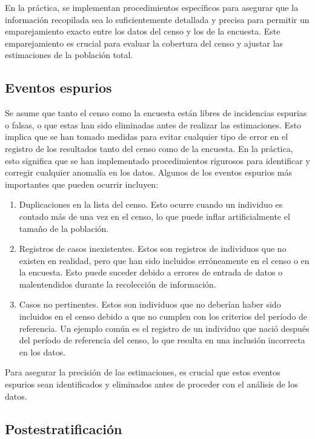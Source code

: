 \documentclass[
  12pt,
]{book}
\providecommand{\tightlist}{%
  \setlength{\itemsep}{0pt}\setlength{\parskip}{0pt}}
\begin{document}
En la práctica, se implementan procedimientos específicos para asegurar que la información recopilada sea lo suficientemente detallada y precisa para permitir un emparejamiento exacto entre los datos del censo y los de la encuesta. Este emparejamiento es crucial para evaluar la cobertura del censo y ajustar las estimaciones de la población total.

\hypertarget{eventos-espurios}{%
\subsection{Eventos espurios}\label{eventos-espurios}}

Se asume que tanto el censo como la encuesta están libres de incidencias espurias o falsas, o que estas han sido eliminadas antes de realizar las estimaciones. Esto implica que se han tomado medidas para evitar cualquier tipo de error en el registro de los resultados tanto del censo como de la encuesta. En la práctica, esto significa que se han implementado procedimientos rigurosos para identificar y corregir cualquier anomalía en los datos. Algunos de los eventos espurios más importantes que pueden ocurrir incluyen:

\begin{enumerate}
\def\labelenumi{\arabic{enumi}.}
\tightlist
\item
  Duplicaciones en la lista del censo. Esto ocurre cuando un individuo es contado más de una vez en el censo, lo que puede inflar artificialmente el tamaño de la población.
\item
  Registros de casos inexistentes. Estos son registros de individuos que no existen en realidad, pero que han sido incluidos erróneamente en el censo o en la encuesta. Esto puede suceder debido a errores de entrada de datos o malentendidos durante la recolección de información.
\item
  Casos no pertinentes. Estos son individuos que no deberían haber sido incluidos en el censo debido a que no cumplen con los criterios del período de referencia. Un ejemplo común es el registro de un individuo que nació después del período de referencia del censo, lo que resulta en una inclusión incorrecta en los datos.
\end{enumerate}

Para asegurar la precisión de las estimaciones, es crucial que estos eventos espurios sean identificados y eliminados antes de proceder con el análisis de los datos.

\hypertarget{postestratificaciuxf3n}{%
\subsection{Postestratificación}\label{postestratificaciuxf3n}}
\end{document}
